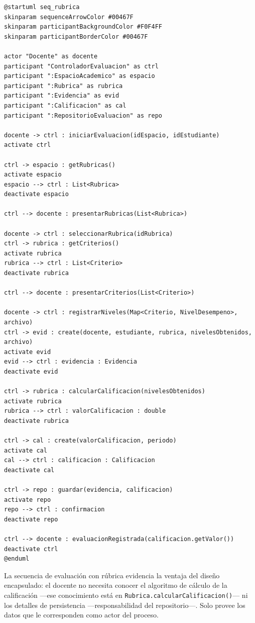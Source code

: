 \begin{lstlisting}[style=plantumlStyle,
  caption={Diagrama de secuencia: registrar evidencia y evaluar con
    rúbrica (PlantUML).},
  label={lst:plantuml-seq-rubrica}]
@startuml seq_rubrica
skinparam sequenceArrowColor #00467F
skinparam participantBackgroundColor #F0F4FF
skinparam participantBorderColor #00467F

actor "Docente" as docente
participant "ControladorEvaluacion" as ctrl
participant ":EspacioAcademico" as espacio
participant ":Rubrica" as rubrica
participant ":Evidencia" as evid
participant ":Calificacion" as cal
participant ":RepositorioEvaluacion" as repo

docente -> ctrl : iniciarEvaluacion(idEspacio, idEstudiante)
activate ctrl

ctrl -> espacio : getRubricas()
activate espacio
espacio --> ctrl : List<Rubrica>
deactivate espacio

ctrl --> docente : presentarRubricas(List<Rubrica>)

docente -> ctrl : seleccionarRubrica(idRubrica)
ctrl -> rubrica : getCriterios()
activate rubrica
rubrica --> ctrl : List<Criterio>
deactivate rubrica

ctrl --> docente : presentarCriterios(List<Criterio>)

docente -> ctrl : registrarNiveles(Map<Criterio, NivelDesempeno>, archivo)
ctrl -> evid : create(docente, estudiante, rubrica, nivelesObtenidos, archivo)
activate evid
evid --> ctrl : evidencia : Evidencia
deactivate evid

ctrl -> rubrica : calcularCalificacion(nivelesObtenidos)
activate rubrica
rubrica --> ctrl : valorCalificacion : double
deactivate rubrica

ctrl -> cal : create(valorCalificacion, periodo)
activate cal
cal --> ctrl : calificacion : Calificacion
deactivate cal

ctrl -> repo : guardar(evidencia, calificacion)
activate repo
repo --> ctrl : confirmacion
deactivate repo

ctrl --> docente : evaluacionRegistrada(calificacion.getValor())
deactivate ctrl
@enduml
\end{lstlisting}

La secuencia de evaluación con rúbrica evidencia la ventaja del diseño
encapsulado: el docente no necesita conocer el algoritmo de cálculo de
la calificación ---ese conocimiento está en \texttt{Rubrica.calcularCalificacion()}---
ni los detalles de persistencia ---responsabilidad del repositorio---. Solo
provee los datos que le corresponden como actor del proceso.

